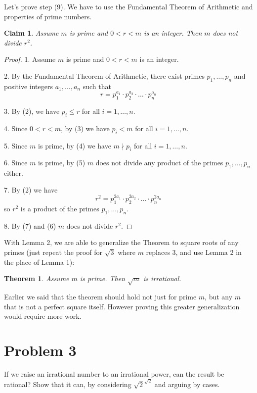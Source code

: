\documentclass[14pt]{extarticle}
\newtheorem{thm}{Theorem}
\newtheorem{claim}{Claim}
\begin{document}
Let's prove step (9). We have to use the Fundamental Theorem of Arithmetic and properties of prime numbers.

\begin{claim}
Assume $m$ is prime and $0 < r < m$ is an integer. Then $m$ does not divide $r^2$.
\end{claim}

\begin{proof}
1. Assume $m$ is prime and $0 < r < m$ is an integer.

2. By the Fundamental Theorem of Arithmetic, there exist primes $p_1, \ldots, p_n$ and positive integers $a_1, \ldots, a_n$ such that
$$
r = p_1^{a_1} \cdot p_2^{a_2} \cdot \ldots \cdot p_n^{a_n}
$$

3. By (2), we have $p_i \leq r$ for all $i = 1, \ldots, n$.

4. Since $0 < r < m$, by (3) we have $p_i < m$ for all $i = 1, \ldots, n$.

5. Since $m$ is prime, by (4) we have $m \nmid p_i$ for all $i = 1, \ldots, n$. 

6. Since $m$ is prime, by (5) $m$ does not divide any product of the primes $p_1, \ldots, p_n$ either.

7. By (2) we have 
$$
r^2 = p_1^{2a_1} \cdot p_2^{2a_2} \cdot \ldots \cdot p_n^{2a_n}
$$
so $r^2$ is a product of the primes $p_1, \ldots, p_n$.

8. By (7) and (6) $m$ does not divide $r^2$.
\end{proof}

With Lemma 2, we are able to generalize the Theorem to square roots of any primes (just repeat the proof for $\sqrt{3}$ where $m$ replaces $3$, and use Lemma 2 in the place of Lemma 1):

\begin{thm}
Assume $m$ is prime. Then $\sqrt{m}$ is irrational.
\end{thm}

Earlier we said that the theorem should hold not just for prime $m$, but any $m$ that is not a perfect square itself. However proving this greater generalization would require more work.

\section{Problem 3}

If we raise an irrational number to an irrational power, can the result be rational? Show that it can, by considering $\sqrt{2}^{\sqrt{2}}$ and arguing by cases.
\end{document}
